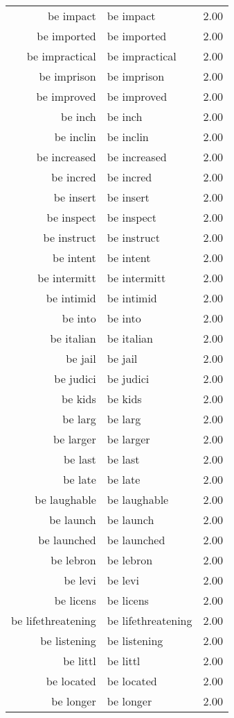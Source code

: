 \begin{table}[ht]
\begin{tabular}{rlr}
  be impact & be impact & 2.00 \\ 
  be imported & be imported & 2.00 \\ 
  be impractical & be impractical & 2.00 \\ 
  be imprison & be imprison & 2.00 \\ 
  be improved & be improved & 2.00 \\ 
  be inch & be inch & 2.00 \\ 
  be inclin & be inclin & 2.00 \\ 
  be increased & be increased & 2.00 \\ 
  be incred & be incred & 2.00 \\ 
  be insert & be insert & 2.00 \\ 
  be inspect & be inspect & 2.00 \\ 
  be instruct & be instruct & 2.00 \\ 
  be intent & be intent & 2.00 \\ 
  be intermitt & be intermitt & 2.00 \\ 
  be intimid & be intimid & 2.00 \\ 
  be into & be into & 2.00 \\ 
  be italian & be italian & 2.00 \\ 
  be jail & be jail & 2.00 \\ 
  be judici & be judici & 2.00 \\ 
  be kids & be kids & 2.00 \\ 
  be larg & be larg & 2.00 \\ 
  be larger & be larger & 2.00 \\ 
  be last & be last & 2.00 \\ 
  be late & be late & 2.00 \\ 
  be laughable & be laughable & 2.00 \\ 
  be launch & be launch & 2.00 \\ 
  be launched & be launched & 2.00 \\ 
  be lebron & be lebron & 2.00 \\ 
  be levi & be levi & 2.00 \\ 
  be licens & be licens & 2.00 \\ 
  be lifethreatening & be lifethreatening & 2.00 \\ 
  be listening & be listening & 2.00 \\ 
  be littl & be littl & 2.00 \\ 
  be located & be located & 2.00 \\ 
  be longer & be longer & 2.00 \\ 

\end{tabular}
\end{table}
